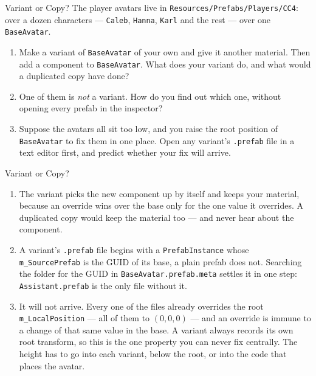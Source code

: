 \begin{exerciseframe}{Variant or Copy?}
  The player avatars live in \texttt{Resources/Prefabs/Players/CC4}: over a
  dozen characters --- \texttt{Caleb}, \texttt{Hanna}, \texttt{Karl} and the
  rest --- over one \texttt{BaseAvatar}.
  \vspace{1ex}

  \begin{enumerate}
    \item Make a variant of \texttt{BaseAvatar} of your own and give it another
      material. Then add a component to \texttt{BaseAvatar}. What does your
      variant do, and what would a duplicated copy have done?
    \item One of them is \emph{not} a variant. How do you find out which one,
      without opening every prefab in the inspector?
    \item Suppose the avatars all sit too low, and you raise the root position
      of \texttt{BaseAvatar} to fix them in one place. Open any variant's
      \texttt{.prefab} file in a text editor first, and predict whether your
      fix will arrive.
  \end{enumerate}
\end{exerciseframe}

\begin{solutionframe}{Variant or Copy?}
  \begin{enumerate}
    \item The variant picks the new component up by itself and keeps your
      material, because an override wins over the base only for the one value
      it overrides. A duplicated copy would keep the material too --- and
      never hear about the component.
    \item A variant's \texttt{.prefab} file begins with a
      \texttt{PrefabInstance} whose \texttt{m\_SourcePrefab} is the GUID of its
      base, a plain prefab does not. Searching the folder for the GUID in
      \texttt{BaseAvatar.prefab.meta} settles it in one step:
      \texttt{Assistant.prefab} is the only file without it.
    \item It will not arrive. Every one of the files already overrides the root
      \texttt{m\_LocalPosition} --- all of them to $(0, 0, 0)$ --- and an
      override is immune to a change of that same value in the base. A variant
      always records its own root transform, so this is the one property you
      can never fix centrally. The height has to go into each variant, below
      the root, or into the code that places the avatar.
  \end{enumerate}
\end{solutionframe}

